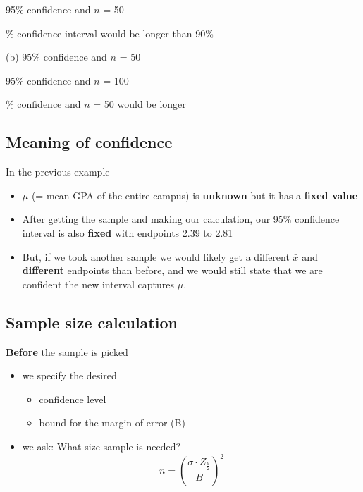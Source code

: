 \documentclass{report}
\begin{document}
\hspace{-4mm}95\% confidence and $n$ = 50
\vspace{1.5mm}

\sol
\vspace{1mm}

\% confidence interval would be longer than 90\%

\bigbreak \noindent
(b) 95\% confidence and $n$ = 50
\vspace{1mm}

\hspace{-5mm} 95\% confidence and $n$ = 100
\vspace{1.5mm}

\sol
\vspace{1.5mm}

\% confidence and $n$ = 50 would be longer
\bigbreak \noindent
\subsection*{Meaning of confidence}
In the previous example
\begin{itemize}
  \item $\mu$ (= mean GPA of the entire campus) is \textbf{unknown} but it has a \textbf{fixed value}
  \item After getting the sample and making our calculation, our 95\% confidence interval is also \textbf{fixed} with endpoints 2.39 to 2.81
  \item But, if we took another sample we would likely get a different $\bar{x}$ and \textbf{different} endpoints than before, and we would still state that we are confident the new interval captures $\mu$.
\end{itemize}
\bigbreak \noindent
\subsection*{Sample size calculation}
\textbf{Before} the sample is picked
\begin{itemize}
  \item we specify the desired 
    \begin{itemize}[label=$\circ$]
      \item confidence level 
      \item bound for the margin of error (B)
    \end{itemize}
  \item we ask: What size sample is needed?
    $$ n = \left(\dfrac{\sigma \cdot Z_{\frac{a}{2}}}{B}\right)^2$$
\end{itemize}
\end{document}
